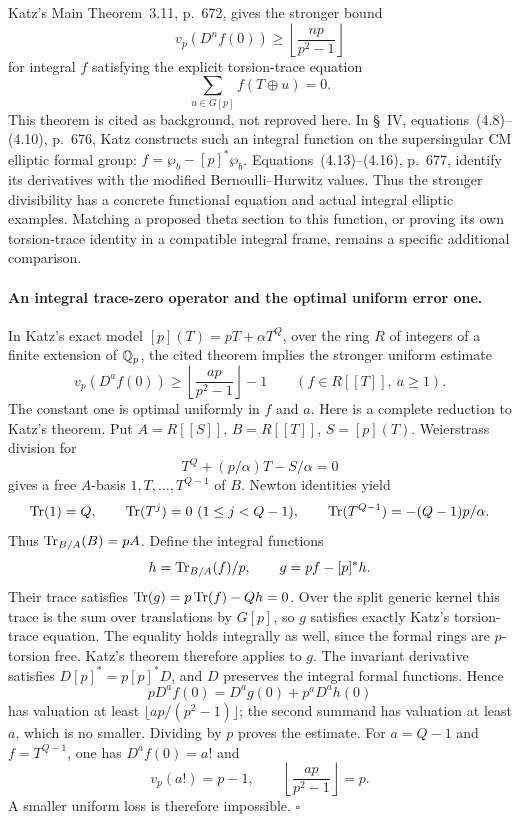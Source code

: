 Katz's Main Theorem~3.11, p.~672, gives the stronger bound
\[
 v_p(D^nf(0))\geq\left\lfloor\frac{np}{p^2-1}\right\rfloor
\]
for integral $f$ satisfying the explicit torsion-trace equation
\[
 \sum_{u\in G[p]}f(T\mathbin\oplus u)=0.
\]
This theorem is cited as background, not reproved here.
In \S~IV, equations~(4.8)--(4.10), p.~676, Katz constructs such an
integral function on the supersingular CM elliptic formal group:
$f=\wp_b-[p]^*\wp_b$. Equations~(4.13)--(4.16), p.~677, identify
its derivatives with the modified Bernoulli--Hurwitz values.
Thus the stronger divisibility has a concrete functional equation
and actual integral elliptic examples. Matching a proposed theta
section to this function, or proving its own torsion-trace identity
in a compatible integral frame, remains a specific additional
comparison.

\paragraph{An integral trace-zero operator and the optimal uniform error one.}
In Katz's exact model $[p](T)=pT+\alpha T^Q$, over the ring $R$
of integers of a finite extension of $\mathbb Q_p$, the cited theorem
implies the stronger uniform estimate
\[
 v_p(D^af(0))\geq
       \left\lfloor\frac{ap}{p^2-1}\right\rfloor-1
       \qquad(f\in R[[T]],\ a\geq1).
\]
The constant one is optimal uniformly in $f$ and $a$.
Here is a complete reduction to Katz's theorem. Put
$A=R[[S]]$, $B=R[[T]]$, $S=[p](T)$. Weierstrass division for
\[
 T^Q+(p/\alpha)T-S/\alpha=0
\]
gives a free $A$-basis $1,T,\ldots,T^{Q-1}$ of $B$.
Newton identities yield
\[
 \operatorname{Tr}(1)=Q,\qquad \operatorname{Tr}(T^j)=0\ (1\leq j<Q-1),\qquad
 \operatorname{Tr}(T^{Q-1})=-(Q-1)p/\alpha.
\]
Thus $\operatorname{Tr}_{B/A}(B)=pA$. Define the integral functions
\[
 h=\operatorname{Tr}_{B/A}(f)/p,\qquad
 g=pf-[p]^*h.
\]
Their trace satisfies $\operatorname{Tr}(g)=p\operatorname{Tr}(f)-Qh=0$.
Over the split generic kernel this trace is the sum over translations
by $G[p]$, so $g$ satisfies exactly Katz's torsion-trace equation.
The equality holds integrally as well, since the formal rings are
$p$-torsion free. Katz's theorem therefore applies to $g$.
The invariant derivative satisfies $D[p]^*=p[p]^*D$, and $D$
preserves the integral formal functions. Hence
\[
 pD^af(0)=D^ag(0)+p^aD^ah(0)
\]
has valuation at least $\lfloor ap/(p^2-1)\rfloor$; the second
summand has valuation at least $a$, which is no smaller.
Dividing by $p$ proves the estimate. For $a=Q-1$ and
$f=T^{Q-1}$, one has $D^af(0)=a!$ and
\[
 v_p(a!)=p-1,
 \qquad\left\lfloor\frac{ap}{p^2-1}\right\rfloor=p.
\]
A smaller uniform loss is therefore impossible. $\square$

